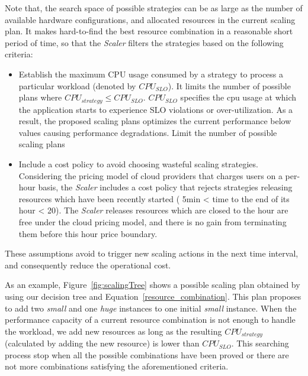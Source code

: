 
Note that, the search space of possible strategies can be as large as the number of available hardware configurations, and allocated resources in the current scaling plan. It makes hard-to-find the best resource combination in a reasonable short period of time, so that the \emph{Scaler} filters the strategies based on the following criteria:
\begin{itemize}
\item Establish the maximum CPU usage consumed  by a strategy to process a particular workload (denoted by \emph{$CPU_{SLO}$}). It limits the number of possible plans where \emph{$CPU_{strategy} \leq CPU_{SLO}$}. \emph{$CPU_{SLO}$} specifies the cpu usage at which the application starts to experience SLO violations or over-utilization. As a result, the proposed scaling plans optimizes the current performance below values causing performance degradations.  Limit the number of possible scaling plans 


\item Include a cost policy to avoid choosing wasteful scaling strategies. Considering the pricing model of cloud providers that charges users on a per-hour basis, the \emph{Scaler} includes a cost policy that rejects strategies releasing resources which have been recently started ( 5min < time to the end of its hour < 20). The \emph{Scaler} releases resources which are closed to the hour are free under the cloud pricing model, and there is no gain from terminating them before this hour price boundary.

\end{itemize}

These assumptions avoid to trigger new scaling actions in the next time interval, and consequently reduce the operational cost. 

As an example, Figure~\ref{fig:scalingTree} shows a possible scaling plan obtained by using our decision tree and Equation~\ref{resource_combination}. This plan proposes to add two \emph{small} and one \emph{huge} instances to one initial \emph{small} instance. When the performance capacity of a current resource combination is not enough to handle the workload, we add new resources as long as the resulting \emph{$CPU_{strategy}$} (calculated by adding the new resource) is lower than \emph{$CPU_{SLO}$}. This searching process stop when all the possible combinations have been proved or there are not more combinations satisfying the aforementioned criteria.


